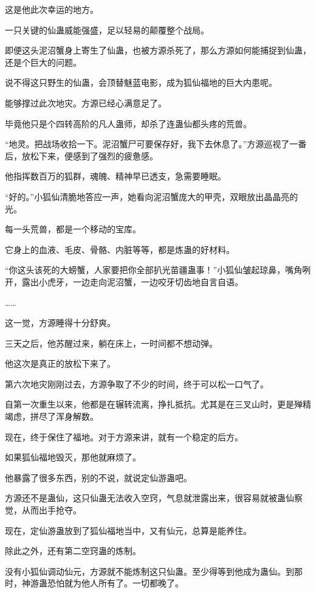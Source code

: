 \begin{this_body}
这是他此次幸运的地方。

一只关键的仙蛊威能强盛，足以轻易的颠覆整个战局。

即便这头泥沼蟹身上寄生了仙蛊，也被方源杀死了，那么方源如何能捕捉到仙蛊，还是个巨大的问题。

说不得这只野生的仙蛊，会顶替魅蓝电影，成为狐仙福地的巨大内患呢。

能够撑过此次地灾。方源已经心满意足了。

毕竟他只是个四转高阶的凡人蛊师，却杀了连蛊仙都头疼的荒兽。

“地灵。把战场收拾一下。泥沼蟹尸可要保存好，我下去休息了。”方源巡视了一番后，放松下来，便感到了强烈的疲惫感。

他指挥数百万的狐群，魂魄、精神早已透支，急需要睡眠。

“好的。”小狐仙清脆地答应一声，她看向泥沼蟹庞大的甲壳，双眼放出晶晶亮的光。

每一头荒兽，都是一个移动的宝库。

它身上的血液、毛皮、骨骼、内脏等等，都是炼蛊的好材料。

“你这头该死的大螃蟹，人家要把你全部扒光苗疆蛊事！”小狐仙皱起琼鼻，嘴角咧开，露出小虎牙，一边走向泥沼蟹，一边咬牙切齿地自言自语。

……

这一觉，方源睡得十分舒爽。

三天之后，他苏醒过来，躺在床上，一时间都不想动弹。

他这次是真正的放松下来了。

第六次地灾刚刚过去，方源争取了不少的时间，终于可以松一口气了。

自第一次重生以来，他都是在辗转流离，挣扎抵抗。尤其是在三叉山时，更是殚精竭虑，拼尽了浑身解数。

现在，终于保住了福地。对于方源来讲，就有一个稳定的后方。

如果狐仙福地毁灭，那他就麻烦了。

他暴露了很多东西，别的不说，就说定仙游蛊吧。

方源还不是蛊仙，这只仙蛊无法收入空窍，气息就泄露出来，很容易就被蛊仙察觉，从而出手抢夺。

现在，定仙游蛊放到了狐仙福地当中，又有仙元，总算是能养住。

除此之外，还有第二空窍蛊的炼制。

没有小狐仙调动仙元，方源就不能炼制这只仙蛊。至少得等到他成为蛊仙。到那时，神游蛊恐怕就为他人所有了。一切都晚了。


\end{this_body}
